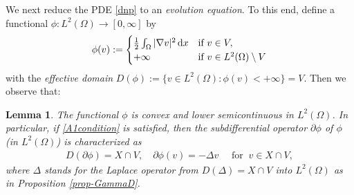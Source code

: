 \documentclass[reqno,10pt]{amsart}
\newtheorem{Lem}[Th]{Lemma}
\begin{document}
We next reduce the PDE \eqref{dnp} to an \emph{evolution equation}. To
this end, define a functional $\phi : L^2(\Omega) \to [0,\infty]$ by
$$
\phi(v):=
\begin{cases}
\frac 1 2 \int_\Omega |\nabla v|^2\,{\text{\rm d}} x
&\mbox{if } v\in V,\\
+\infty 
& \mbox{if } v\in L^2(\Omega)\setminus V
\end{cases}
$$
with the \emph{effective domain} $D(\phi) := \{v \in L^2(\Omega) \colon
\phi(v) < +\infty\} = V$.
Then  we observe that:
\begin{Lem}\label{lem-mm}
The functional $\phi$ is convex and lower semicontinuous
in $L^2(\Omega)$. In particular, if \eqref{A1condition} is satisfied,
 then the subdifferential operator $\partial \phi$ of $\phi$ {\rm (}in
 $L^2(\Omega)${\rm )} is characterized as
\begin{align*}
D(\partial \phi)= X \cap V,\quad
\partial \phi(v)= -\Delta v\quad \mbox{ for } \ v\in X\cap V,
\end{align*}
where $\Delta$ stands for the Laplace operator from $D(\Delta) = X
 \cap V$ into $L^2(\Omega)$ as in Proposition \ref{prop-GammaD}.
\end{Lem}
\end{document}

